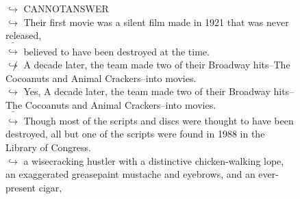 \documentclass[11pt,a4paper, onecolumn]{article}
\begin{document}
\begin{figure}[t] \small \begin{tcolorbox}[boxsep=0pt,left=5pt,right=0pt,top=2pt,colback = yellow!5] \begin{dialogue}
 \small 
\colorbox{pink!25}{$\hookrightarrow$}
{ CANNOTANSWER }
\\
\colorbox{pink!25}{$\hookrightarrow$}
{ Their first movie was a silent film made in 1921 that was never released, }
\\
\colorbox{pink!25}{ $\bar{\hookrightarrow}$}
{ believed to have been destroyed at the time. }
\\
\colorbox{pink!25}{$\not\hookrightarrow$}
{ A decade later, the team made two of their Broadway hits--The Cocoanuts and Animal Crackers--into movies. }
\\
\colorbox{pink!25}{$\hookrightarrow$}
\colorbox{red!25}{Yes,}
{ A decade later, the team made two of their Broadway hits--The Cocoanuts and Animal Crackers--into movies. }
\\
\colorbox{pink!25}{ $\bar{\hookrightarrow}$}
{ Though most of the scripts and discs were thought to have been destroyed, all but one of the scripts were found in 1988 in the Library of Congress. }
\\
\colorbox{pink!25}{$\hookrightarrow$}
{ a wisecracking hustler with a distinctive chicken-walking lope, an exaggerated greasepaint mustache and eyebrows, and an ever-present cigar, }
\\
 \end{dialogue}\end{tcolorbox}\end{figure}
\end{document}
